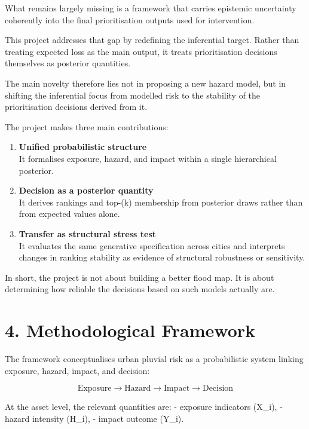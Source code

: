 \documentclass[
]{article}
\begin{document}
What remains largely missing is a framework that carries epistemic
uncertainty coherently into the final prioritisation outputs used for
intervention.

This project addresses that gap by redefining the inferential target.
Rather than treating expected loss as the main output, it treats
prioritisation decisions themselves as posterior quantities.

The main novelty therefore lies not in proposing a new hazard model, but
in shifting the inferential focus from modelled risk to the stability of
the prioritisation decisions derived from it.

The project makes three main contributions:

\begin{enumerate}
\def\labelenumi{\arabic{enumi}.}
\item
  \textbf{Unified probabilistic structure}\\
  It formalises exposure, hazard, and impact within a single
  hierarchical posterior.
\item
  \textbf{Decision as a posterior quantity}\\
  It derives rankings and top-(k) membership from posterior draws rather
  than from expected values alone.
\item
  \textbf{Transfer as structural stress test}\\
  It evaluates the same generative specification across cities and
  interprets changes in ranking stability as evidence of structural
  robustness or sensitivity.
\end{enumerate}

In short, the project is not about building a better flood map. It is
about determining how reliable the decisions based on such models
actually are.

\section{4. Methodological Framework}\label{methodological-framework}

The framework conceptualises urban pluvial risk as a probabilistic
system linking exposure, hazard, impact, and decision:

\[
\text{Exposure} \rightarrow \text{Hazard} \rightarrow \text{Impact} \rightarrow \text{Decision}
\]

At the asset level, the relevant quantities are: - exposure indicators
(X\_i), - hazard intensity (H\_i), - impact outcome (Y\_i).
\end{document}
